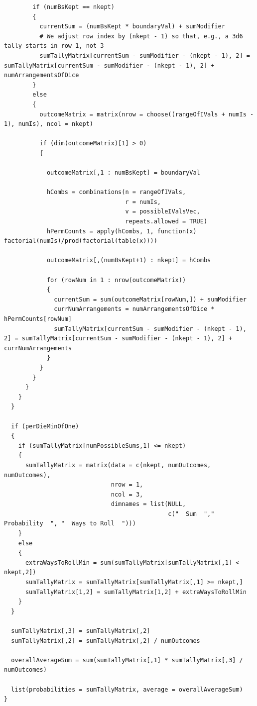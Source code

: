 \documentclass[12pt]{article}
\begin{document}
\begin{lstlisting}
        if (numBsKept == nkept)
        {
          currentSum = (numBsKept * boundaryVal) + sumModifier
          # We adjust row index by (nkept - 1) so that, e.g., a 3d6 tally starts in row 1, not 3
          sumTallyMatrix[currentSum - sumModifier - (nkept - 1), 2] = sumTallyMatrix[currentSum - sumModifier - (nkept - 1), 2] + numArrangementsOfDice
        }
        else
        {
          outcomeMatrix = matrix(nrow = choose((rangeOfIVals + numIs - 1), numIs), ncol = nkept)
          
          if (dim(outcomeMatrix)[1] > 0)
          {
            
            outcomeMatrix[,1 : numBsKept] = boundaryVal
            
            hCombs = combinations(n = rangeOfIVals,
                                  r = numIs,
                                  v = possibleIValsVec,
                                  repeats.allowed = TRUE)
            hPermCounts = apply(hCombs, 1, function(x) factorial(numIs)/prod(factorial(table(x))))
            
            outcomeMatrix[,(numBsKept+1) : nkept] = hCombs
            
            for (rowNum in 1 : nrow(outcomeMatrix))
            {
              currentSum = sum(outcomeMatrix[rowNum,]) + sumModifier
              currNumArrangements = numArrangementsOfDice * hPermCounts[rowNum]
              sumTallyMatrix[currentSum - sumModifier - (nkept - 1), 2] = sumTallyMatrix[currentSum - sumModifier - (nkept - 1), 2] + currNumArrangements
            }
          }
        }
      }
    }
  }
  
  if (perDieMinOfOne)
  {
    if (sumTallyMatrix[numPossibleSums,1] <= nkept)
    {
      sumTallyMatrix = matrix(data = c(nkept, numOutcomes, numOutcomes),
                              nrow = 1,
                              ncol = 3,
                              dimnames = list(NULL,
                                              c("  Sum  ","  Probability  ", "  Ways to Roll  ")))
    }
    else
    {
      extraWaysToRollMin = sum(sumTallyMatrix[sumTallyMatrix[,1] < nkept,2])
      sumTallyMatrix = sumTallyMatrix[sumTallyMatrix[,1] >= nkept,]
      sumTallyMatrix[1,2] = sumTallyMatrix[1,2] + extraWaysToRollMin
    }
  }
  
  sumTallyMatrix[,3] = sumTallyMatrix[,2]
  sumTallyMatrix[,2] = sumTallyMatrix[,2] / numOutcomes
  
  overallAverageSum = sum(sumTallyMatrix[,1] * sumTallyMatrix[,3] / numOutcomes)
  
  list(probabilities = sumTallyMatrix, average = overallAverageSum)
}
\end{lstlisting}
\end{document}
